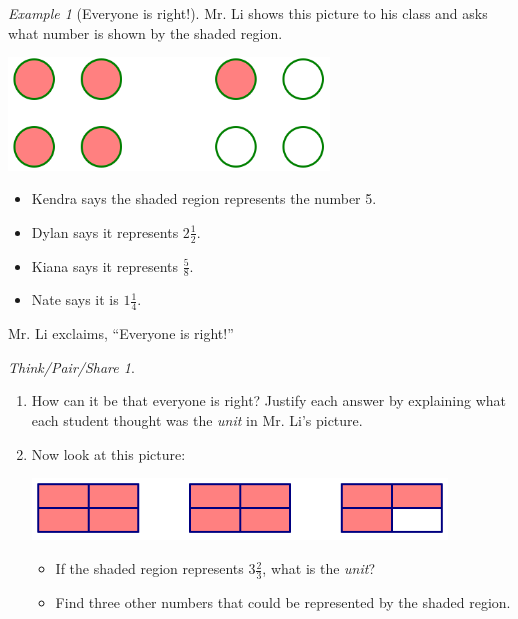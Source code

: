 \documentclass[10pt, reqno]{amsart}
\theoremstyle{remark}
\newtheorem{example}[thm]{Example}
\newtheorem*{thinkpair*}{Think/Pair/Share}
\theoremstyle{definition}
\numberwithin{equation}{section}  %
\begin{document}
\begin{example}[Everyone is right!]
Mr. Li shows this picture to his class and asks what number is shown by the shaded region.

\begin{center}
\includegraphics[height = 3cm]{unit1}
\end{center}
\begin{itemize}
\item
Kendra says the shaded region represents the number 5.
\item
Dylan says it represents $2\frac 1 2$.
\item
Kiana says it represents $\frac 5 8$.
\item
Nate says it is $1 \frac 1 4$.
\end{itemize}

Mr. Li exclaims, ``Everyone is right!''

\end{example}

\begin{thinkpair*}\ 
\begin{enumerate}
\item
How can it be that everyone is right?  Justify each answer by explaining what each student thought was the \emph{unit} in Mr. Li's picture.\\

\item
Now look at this picture:
\begin{center}
\includegraphics[width = 11cm]{unit2}
\end{center}

\begin{itemize}
\item
If the shaded region represents $3\frac 2 3$, what is the \emph{unit}?
\item
Find three other numbers that could be represented by the shaded region.
\end{itemize}
\end{enumerate}

\end{thinkpair*}
\end{document}
